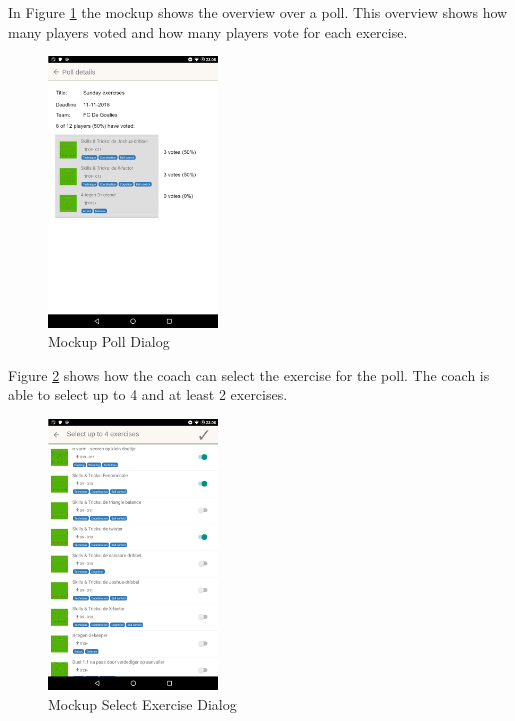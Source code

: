 In Figure \ref{fig:mockup_poll} the mockup shows the overview over a poll. This overview shows how many players voted and how many players vote for each exercise. 

\begin{figure}[H]
    \begin{center}
        \includegraphics[width=0.4\textwidth]{images/mockups/poll.png}
        \caption{Mockup Poll Dialog}
        \label{fig:mockup_poll}
    \end{center}
\end{figure}

Figure \ref{fig:mockup_select} shows how the coach can select the exercise for the poll. The coach is able to select up to 4 and at least 2 exercises. 

\begin{figure}[H]
    \begin{center}
        \includegraphics[width=0.4\textwidth]{images/mockups/select-exercises.png}
        \caption{Mockup Select Exercise Dialog}
        \label{fig:mockup_select}
    \end{center}
\end{figure}

